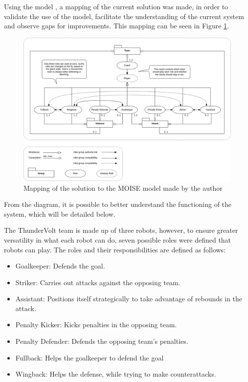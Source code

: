 Using the \MOISEp model \cite{MOISEp}, a mapping of the current solution was made, in order to validate the use of the model, facilitate the understanding of the current system and observe gaps for improvements. This mapping can be seen in Figure \ref{fig:moise_mapping}.

\begin{figure}[!ht]
    \centering
    \includegraphics[width=\linewidth]{images/ThunderVolt Moise-Structural Specification.png}
    \caption{Mapping of the solution to the MOISE model made by the author}
    \label{fig:moise_mapping}
\end{figure}

From the diagram, it is possible to better understand the functioning of the system, which will be detailed below. 

The ThunderVolt team is made up of three robots, however, to ensure greater versatility in what each robot can do, seven possible roles were defined that robots can play. The roles and their responsibilities are defined as follows:

\begin{itemize}
    \item Goalkeeper: Defends the goal.
    \item Striker: Carries out attacks against the opposing team.
    \item Assistant: Positions itself strategically to take advantage of rebounds in the attack.
    \item Penalty Kicker: Kicks penalties in the opposing team.
    \item Penalty Defender: Defends the opposing team's penalties.
    \item Fullback: Helps the goalkeeper to defend the goal
    \item Wingback: Helps the defense, while trying to make counterattacks.
\end{itemize}

